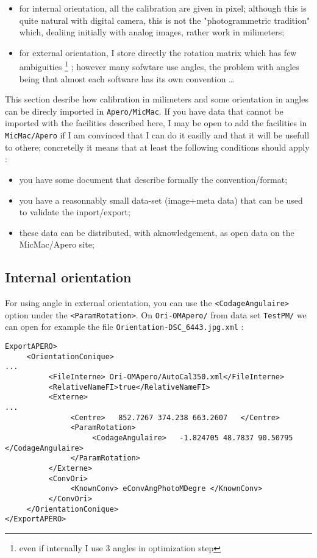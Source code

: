 \begin{itemize}
    \item for internal orientation, all the calibration are given in pixel;
          although this is quite natural with digital camera, this is
          not the "photogrammetric tradition" which, dealiing initially with
          analog images, rather work in milimeters;

    \item for external orientation, I store directly the rotation matrix which
          has few ambiguities \footnote{even if internally I use $3$ angles in 
          optimization step} ; however many sofwtare use angles,  the problem
          with angles being that  almost each software has its own convention \dots
\end{itemize}

This section desribe how calibration in milimeters and some orientation in angles
can be direcly imported in {\tt Apero/MicMac}.  If you have data that cannot be
imported with the facilities described here, I may be open to add the facilities in
{\tt MicMac/Apero} if I am convinced that I can do it easilly and that it will 
be usefull to othere; concretelly it means that at least the following conditions should apply :

\begin{itemize}
      \item  you have some document that describe formally the convention/format;
      \item  you have a reasonnably small data-set (image+meta data) that can  be used
             to validate the inport/export;
      \item  these data can be distributed, with aknowledgement, as open data on the 
             MicMac/Apero site;
\end{itemize}

\subsection{Internal orientation}

For using angle in external orientation, you can use the {\tt  <CodageAngulaire> }
option under the {\tt <ParamRotation>}. On {\tt Ori-OMApero/} from data set
{\tt TestPM/} we can open for example the file {\tt Orientation-DSC\_6443.jpg.xml} :

\begin{verbatim}
ExportAPERO>
     <OrientationConique>
...
          <FileInterne> Ori-OMApero/AutoCal350.xml</FileInterne>
          <RelativeNameFI>true</RelativeNameFI>
          <Externe>
...
               <Centre>   852.7267 374.238 663.2607   </Centre>
               <ParamRotation>
                    <CodageAngulaire>   -1.824705 48.7837 90.50795 </CodageAngulaire>
               </ParamRotation>
          </Externe>
          <ConvOri>
               <KnownConv> eConvAngPhotoMDegre </KnownConv>
          </ConvOri>
     </OrientationConique>
</ExportAPERO>

\end{verbatim}

